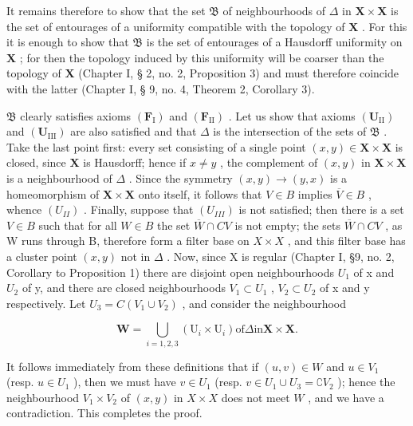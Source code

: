 It remains therefore to show that the set \(\mathfrak{B}\) of neighbourhoods of \(\Delta\) in \(\mathbf{X} \times \mathbf{X}\) is the set of entourages of a uniformity compatible with the topology of \(\mathbf{X}\) . For this it is enough to show that \(\mathfrak{B}\) is the set of entourages of a Hausdorff uniformity on \(\mathbf{X}\) ; for then the topology induced by this uniformity will be coarser than the topology of \(\mathbf{X}\) (Chapter I, § 2, no. 2, Proposition 3) and must therefore coincide with the latter (Chapter I, § 9, no. 4, Theorem 2, Corollary 3).

\(\mathfrak{B}\) clearly satisfies axioms \((\mathbf{F}_{\mathrm{I}})\) and \((\mathbf{F}_{\mathrm{II}})\) . Let us show that axioms \((\mathbf{U}_{\mathrm{II}})\) and \((\mathbf{U}_{\mathrm{III}})\) are also satisfied and that \(\Delta\) is the intersection of the sets of \(\mathfrak{B}\) . Take the last point first: every set consisting of a single point \((x, y) \in \mathbf{X} \times \mathbf{X}\) is closed, since \(\mathbf{X}\) is Hausdorff; hence if \(x \neq y\) , the complement of \((x, y)\) in \(\mathbf{X} \times \mathbf{X}\) is a neighbourhood of \(\Delta\) . Since the symmetry \((x, y) \to (y, x)\) is a homeomorphism of \(\mathbf{X} \times \mathbf{X}\) onto itself, it follows that \(V \in B\) implies \(\overline{V} \in B\) , whence \((U_{II})\) . Finally, suppose that \((U_{III})\) is not satisfied; then there is a set \(V \in B\) such that for all \(W \in B\) the set \(\overline{W} \cap C V\) is not empty; the sets \(\overline{W} \cap C V\) , as W runs through B, therefore form a filter base on \(X \times X\) , and this filter base has a cluster point \((x, y)\) not in \(\Delta\) . Now, since X is regular (Chapter I, §9, no. 2, Corollary to Proposition 1) there are disjoint open neighbourhoods \(U_{1}\) of x and \(U_{2}\) of y, and there are closed neighbourhoods \(V_{1} \subset U_{1}\) , \(V_{2} \subset U_{2}\) of x and y respectively. Let \(U_{3} = C(V_{1} \cup V_{2})\) , and consider the neighbourhood

\[
\mathbf {W} = \bigcup_ {i = 1, 2, 3} (\mathrm{U} _ {i} \times \mathrm{U} _ {i}) \text {of} \Delta \text {in} \mathbf {X} \times \mathbf {X}.
\]

It follows immediately from these definitions that if \((u, v) \in W\) and \(u \in V_1\) (resp. \(u \in U_1\) ), then we must have \(v \in U_1\) (resp. \(v \in U_1 \cup U_3 = \complement V_2\) ); hence the neighbourhood \(V_1 \times V_2\) of \((x, y)\) in \(X \times X\) does not meet \(W\) , and we have a contradiction. This completes the proof.

